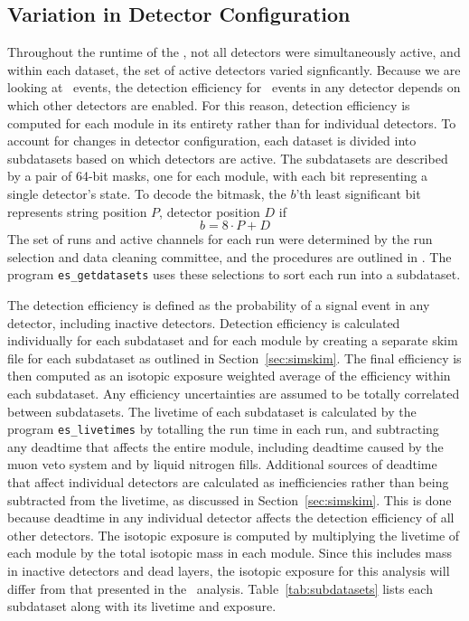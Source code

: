\documentclass[/main.tex]{subfiles}
\begin{document}
\subsection{Variation in Detector Configuration} \label{sec:sds}
Throughout the runtime of the \MJD, not all detectors were simultaneously active, and within each dataset, the set of active detectors varied signficantly.
Because we are looking at \msmd\ events, the detection efficiency for \bbes\ events in any detector depends on which other detectors are enabled.
For this reason, detection efficiency is computed for each module in its entirety rather than for individual detectors.
To account for changes in detector configuration, each dataset is divided into subdatasets based on which detectors are active.
The subdatasets are described by a pair of 64-bit masks, one for each module, with each bit representing a single detector's state.
To decode the bitmask, the $b$'th least significant bit represents string position $P$, detector position $D$ if
\begin{equation}\label{eq:sdsbitmask}
  b = 8\cdot P + D
\end{equation}
The set of runs and active channels for each run were determined by the run selection and data cleaning committee, and the procedures are outlined in \cite{2018Reine}.
The program \texttt{es\_getdatasets} uses these selections to sort each run into a subdataset.

The detection efficiency is defined as the probability of a signal event in any detector, including inactive detectors.
Detection efficiency is calculated individually for each subdataset and for each module by creating a separate skim file for each subdataset as outlined in Section~\ref{sec:simskim}.
The final efficiency is then computed as an isotopic exposure weighted average of the efficiency within each subdataset.
Any efficiency uncertainties are assumed to be totally correlated between subdatasets.
The livetime of each subdataset is calculated by the program \texttt{es\_livetimes} by totalling the run time in each run, and subtracting any deadtime that affects the entire module, including deadtime caused by the muon veto system and by liquid nitrogen fills.
Additional sources of deadtime that affect individual detectors are calculated as inefficiencies rather than being subtracted from the livetime, as discussed in Section~\ref{sec:simskim}.
This is done because deadtime in any individual detector affects the detection efficiency of all other detectors.
The isotopic exposure is computed by multiplying the livetime of each module by the total isotopic mass in each module.
Since this includes mass in inactive detectors and dead layers, the isotopic exposure for this analysis will differ from that presented in the \znbb\ analysis.
Table~\ref{tab:subdatasets} lists each subdataset along with its livetime and exposure.
\end{document}

